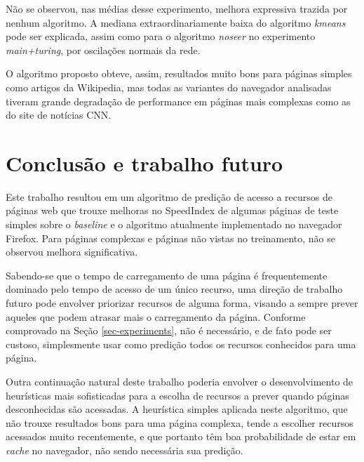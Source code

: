 \documentclass[10pt,twocolumn,letterpaper]{article}
\begin{document}
Não se observou, nas médias desse experimento, melhora expressiva trazida por nenhum algoritmo. A mediana extraordinariamente baixa do algoritmo \emph{kmeans} pode ser explicada, assim como para o algoritmo \emph{noseer} no experimento \emph{main+turing}, por oscilações normais da rede.

O algoritmo proposto obteve, assim, resultados muito bons para páginas simples como artigos da Wikipedia, mas todas as variantes do navegador analisadas tiveram grande degradação de performance em páginas mais complexas como as do site de notícias CNN.

\section{Conclusão e trabalho futuro}

Este trabalho resultou em um algoritmo de predição de acesso a recursos de páginas web que trouxe melhoras no SpeedIndex de algumas páginas de teste simples sobre o \emph{baseline} e o algoritmo atualmente implementado no navegador Firefox. Para páginas complexas e páginas não vistas no treinamento, não se observou melhora significativa.

Sabendo-se que o tempo de carregamento de uma página é frequentemente dominado pelo tempo de acesso de um único recurso, uma direção de trabalho futuro pode envolver priorizar recursos de alguma forma, visando a sempre prever aqueles que podem atrasar mais o carregamento da página. Conforme comprovado na Seção \ref{sec-experiments}, não é necessário, e de fato pode ser custoso, simplesmente usar como predição todos os recursos conhecidos para uma página.

Outra continuação natural deste trabalho poderia envolver o desenvolvimento de heurísticas mais sofisticadas para a escolha de recursos a prever quando páginas desconhecidas são acessadas. A heurística simples aplicada neste algoritmo, que não trouxe resultados bons para uma página complexa, tende a escolher recursos acessados muito recentemente, e que portanto têm boa probabilidade de estar em \emph{cache} no navegador, não sendo necessária sua predição.

{\small


}
\end{document}
